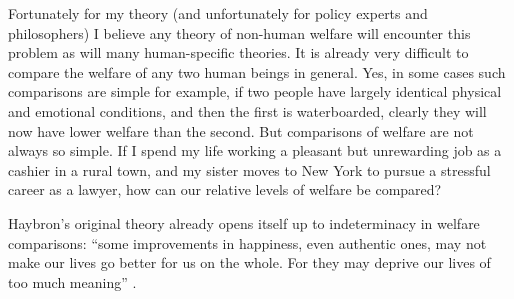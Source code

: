 \documentclass{article}
\begin{document}
Fortunately for my theory (and unfortunately for policy experts and philosophers) I believe any theory of non-human welfare will encounter this problem \textemdash{} as will many human-specific theories. It is already very difficult to compare the welfare of any two human beings in general. Yes, in some cases such comparisons are simple \textemdash{} for example, if two people have largely identical physical and emotional conditions, and then the first is waterboarded, clearly they will now have lower welfare than the second. But comparisons of welfare are not always so simple. If I spend my life working a pleasant but unrewarding job as a cashier in a rural town, and my sister moves to New York to pursue a stressful career as a lawyer, how can our relative levels of welfare be compared?

Haybron's original theory already opens itself up to indeterminacy in welfare comparisons: ``some improvements in happiness, even authentic ones, may not make our lives go better for us on the whole. For they may deprive our lives of too much meaning'' \citep[pg. 194]{haybron2008pursuit}. 







\end{document}
